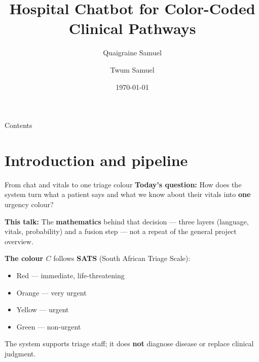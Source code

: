 \documentclass[aspectratio=169,11pt]{beamer}
\title[Friday Presentation]{Hospital Chatbot for Color-Coded Clinical Pathways}
\author{Quaigraine Samuel \and Twum Samuel}
\institute{Department of Mathematics\\Kwame Nkrumah University of Science and Technology}
\date{\today}
\newcommand{\bcol}[2][blue!70!black]{\textcolor{#1}{#2}}
\begin{document}
\begin{frame}
	\titlepage
\end{frame}

\begin{frame}{Contents}
	\tableofcontents
\end{frame}

\section{Introduction and pipeline}

\begin{frame}{From chat and vitals to one triage colour}
	\textbf{Today's question:} How does the system turn what a patient says and what we know about their vitals into \textbf{one} urgency colour?

	\vspace{0.3em}
	\textbf{This talk:} The \textbf{mathematics} behind that decision --- three layers (language, vitals, probability) and a fusion step --- not a repeat of the general project overview.

	\vspace{0.25em}
	\textbf{The colour $C$} follows \textbf{SATS} (South African Triage Scale):
	\begin{itemize}
		\item \bcol[triageRed]{Red} --- immediate, life-threatening
		\item \bcol[triageOrange]{Orange} --- very urgent
		\item \bcol[triageYellow]{Yellow} --- urgent
		\item \bcol[triageGreen]{Green} --- non-urgent
	\end{itemize}

	\vspace{0.25em}
	\footnotesize The system supports triage staff; it does \textbf{not} diagnose disease or replace clinical judgment.
\end{frame}
\end{document}
